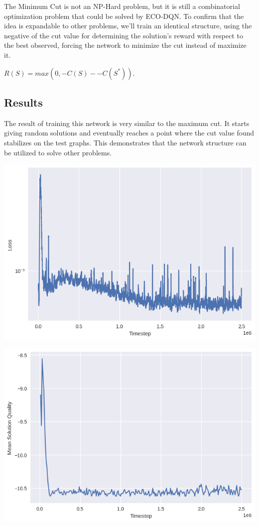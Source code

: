 \documentclass{article}
\begin{document}
The Minimum Cut is not an NP-Hard problem, but it is still a combinatorial optimization problem that could be solved by ECO-DQN. To confirm that the idea is expandable to other problems, we'll train an identical structure, using the negative of the cut value for determining the solution's reward with respect to the best observed, forcing the network to minimize the cut instead of maximize it. 

$R(S) = max(0, -C(S) - -C(S^*))$. 

\subsection{Results}

The result of training this network is very similar to the maximum cut. It starts giving random solutions and eventually reaches a point where the cut value found stabilizes on the test graphs. This demonstrates that the network structure can be utilized to solve other problems.

\includegraphics[scale=0.5]{../ER_20spin/eco/min_cut/network/loss.png}

\includegraphics[scale=0.5]{../ER_20spin/eco/min_cut/network/training_curve.png}
\end{document}
